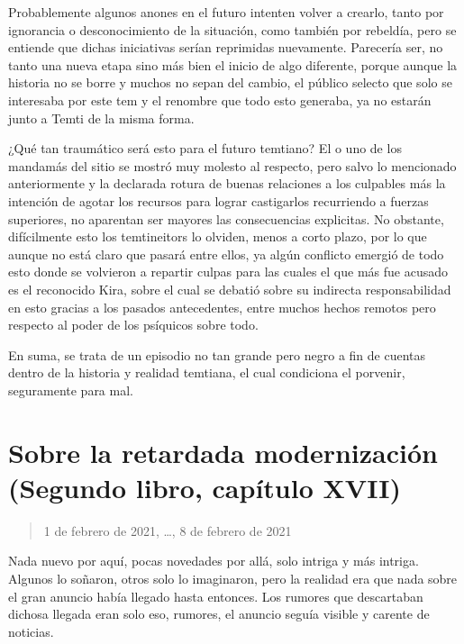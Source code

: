 \documentclass[
  spanish,
]{book}
\begin{document}
Probablemente algunos anones en el futuro intenten volver a crearlo, tanto por ignorancia o desconocimiento de la situación, como también por rebeldía, pero se entiende que dichas iniciativas serían reprimidas nuevamente. Parecería ser, no tanto una nueva etapa sino más bien el inicio de algo diferente, porque aunque la historia no se borre y muchos no sepan del cambio, el público selecto que solo se interesaba por este tem y el renombre que todo esto generaba, ya no estarán junto a Temti de la misma forma.

¿Qué tan traumático será esto para el futuro temtiano? El o uno de los mandamás del sitio se mostró muy molesto al respecto, pero salvo lo mencionado anteriormente y la declarada rotura de buenas relaciones a los culpables más la intención de agotar los recursos para lograr castigarlos recurriendo a fuerzas superiores, no aparentan ser mayores las consecuencias explicitas. No obstante, difícilmente esto los temtineitors lo olviden, menos a corto plazo, por lo que aunque no está claro que pasará entre ellos, ya algún conflicto emergió de todo esto donde se volvieron a repartir culpas para las cuales el que más fue acusado es el reconocido Kira, sobre el cual se debatió sobre su indirecta responsabilidad en esto gracias a los pasados antecedentes, entre muchos hechos remotos pero respecto al poder de los psíquicos sobre todo.

En suma, se trata de un episodio no tan grande pero negro a fin de cuentas dentro de la historia y realidad temtiana, el cual condiciona el porvenir, seguramente para mal.

\hypertarget{sobre-la-retardada-modernizaciuxf3n-segundo-libro-capuxedtulo-xvii}{%
\section{Sobre la retardada modernización (Segundo libro, capítulo XVII)}\label{sobre-la-retardada-modernizaciuxf3n-segundo-libro-capuxedtulo-xvii}}

\begin{quote}
1 de febrero de 2021, \ldots, 8 de febrero de 2021
\end{quote}

Nada nuevo por aquí, pocas novedades por allá, solo intriga y más intriga. Algunos lo soñaron, otros solo lo imaginaron, pero la realidad era que nada sobre el gran anuncio había llegado hasta entonces. Los rumores que descartaban dichosa llegada eran solo eso, rumores, el anuncio seguía visible y carente de noticias.
\end{document}

